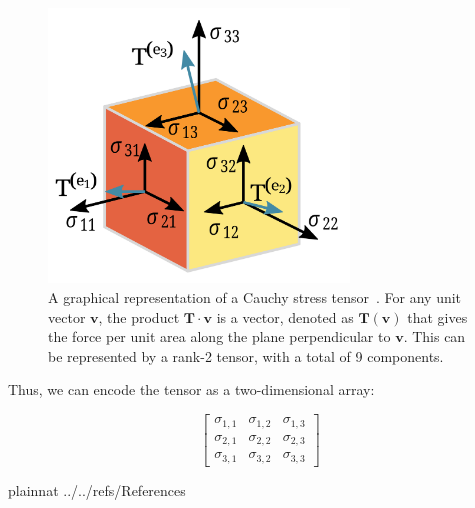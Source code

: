\documentclass[12pt]{article}
\begin{document}
\begin{figure}[h!]
  \includegraphics[width=8cm]{Figs/Components_stress_tensor.svg.png}
  \centering
  \caption{A graphical representation of a Cauchy stress tensor~\citep{Wikipedia_Tensors_2025}.
          For any unit vector $\mathbf{v}$, the product $\mathbf T \cdot \mathbf v$ 
          is a vector, denoted as $\mathbf T (\mathbf v)$ that gives the force
          per unit area along the plane perpendicular to $\mathbf v$.
          This can be represented by a rank-2 tensor,
          with a total of 9 components.}
\end{figure}

Thus, we can encode the tensor as a two-dimensional array:

$$\begin{bmatrix}
  \sigma_{1,1} & \sigma_{1,2} & \sigma_{1,3}\\
  \sigma_{2,1} & \sigma_{2,2} & \sigma_{2,3}\\
  \sigma_{3,1} & \sigma_{3,2} & \sigma_{3,3}
\end{bmatrix}
$$








\newpage

 {plainnat}
 {../../refs/References}
\end{document}
